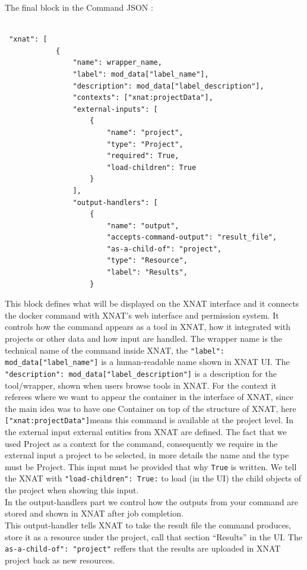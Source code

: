 The final block in the Command JSON :

\begin{lstlisting}

 "xnat": [
            {
                "name": wrapper_name,
                "label": mod_data["label_name"],
                "description": mod_data["label_description"],
                "contexts": ["xnat:projectData"],  
                "external-inputs": [
                    { 
                        "name": "project",
                        "type": "Project",
                        "required": True,
                        "load-children": True
                    }
                ],
                "output-handlers": [
                    {
                        "name": "output",
                        "accepts-command-output": "result_file",
                        "as-a-child-of": "project",
                        "type": "Resource",
                        "label": "Results",
                    }
\end{lstlisting}

This block defines what will be displayed on the XNAT interface and it connects the docker command with XNAT's web interface and permission system. It controls how the command appears as a tool in XNAT, how it integrated with projects or other data and how input are handled.
The wrapper name is the technical name of the command inside XNAT, the \texttt{"label": mod\_data["label\_name"]} is a human-readable name shown in XNAT \ac{UI}. The \texttt{"description": mod\_data["label\_description"]} is a description for the tool/wrapper, shown when users browse tools in XNAT. For the context it referees where we want to appear the container in the interface of XNAT, since the main idea was to have one Container on top of the structure of XNAT, here \texttt{["xnat:projectData"]}means this command is available at the project level.
 In the external input external entities from XNAT are defined. The fact that we used Project as a context for the command, consequently we require in the external input a project to be selected, in more details the name and the type must be Project. This input must be provided that why \texttt{True} is written.
 We tell the XNAT with \texttt{"load-children": True:} to load (in the UI) the child objects of the project when showing this input.\\
 In the output-handlers part we control  how the outputs from your command are stored and shown in XNAT after job completion.\\
 This output-handler tells XNAT to take the result file the command produces, store it as a resource under the project, call that section “Results” in the UI. 
 The \texttt{as-a-child-of": "project"} reffers that the results are uploaded in XNAT project back as new resources.

